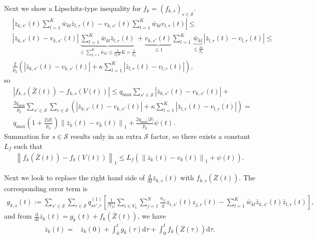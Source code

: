 \documentclass{article}
\renewcommand{\d}{\mathrm{d}}
\newcommand{\1}[1]{{\mathds{1}}_{\left\{#1\right\}}}
\begin{document}
	Next we show a Lipschitz-type inequality for $f_{k}=\left(f_{k,s} \right)_{s \in \mathcal{S}}.$ 
	\begin{align*}
		&\left|\bar{z}_{k,s'}(t)\sum_{l=1}^{K}\bar{w}_{kl}\bar{z}_{l,r}(t)	-v_{k,s'}(t)\sum_{l=1}^{K}\bar{w}_{kl}v_{l,r}(t) \right| \leq \\
		&\left|\bar{z}_{k,s'}(t)-v_{k,s'}(t) \right| \underbrace{\sum_{l=1}^{K}\bar{w}_{kl}\bar{z}_{l,r}(t)}_{\leq \sum_{k=1}^K\bar{w}_{kl} \leq \frac{2}{p_0 K}K=\frac{2}{p_0}}+\underbrace{v_{k,s'}(t)}_{\leq 1}\sum_{l=1}^{K}\underbrace{\bar{w}_{kl}}_{\leq \frac{2\kappa}{p_0} }\left|\bar{z}_{l,r}(t)-v_{l,r}(t)\right| \leq \\
		&\frac{2}{p_0}\left( \left|\bar{z}_{k,s'}(t)-v_{k,s'}(t) \right|+\kappa \sum_{l=1}^{K}\left|\bar{z}_{l,r}(t)-v_{l,r}(t) \right|\right),
	\end{align*}
	so
	\begin{align*} &\left|f_{k,s}\left(\bar{Z}(t) \right)-f_{k,s}\left(V(t) \right) \right|\leq 	
		q_{\max}\sum_{s' \in \mathcal{S}} \left|\bar{z}_{k,s'}(t)-v_{k,s'}(t) \right|+\\
		&\frac{2q_{\max}}{p_0}\sum_{s' \in \mathcal{S}}\sum_{r \in \mathcal{S}} \left( \left|\bar{z}_{k,s'}(t)-v_{k,s'}(t) \right|+\kappa \sum_{l=1}^{K}\left|\bar{z}_{l,r}(t)-v_{l,r}(t) \right|\right) = \\
		&q_{\max}\left(1+\frac{2 \left|\mathcal{S} \right|}{p_0} \right)\left \|\bar{z}_{k}(t)-v_{k}(t) \right \|_1+\frac{2q_{\max}\left|\mathcal{S} \right|}{p_0} \psi(t).
	\end{align*}
	Summation for $s\in \mathcal{S}$ results only in an extra $\mathcal{S}$ factor, so there exists a constant $L_f$ such that
	\begin{align}
		\label{eq:L_f}
		\left \|f_k \left(\overline{Z}(t) \right)-f_k \left(V(t)\right) \right \|_1 \leq L_f \left(\left \|\bar{z}_k(t)-v_k(t) \right \|_1+\psi(t) \right).
	\end{align}
	
	Next we look to replace the right hand side of $\frac{\d}{\d t} \bar{z}_{k,s}(t)$ with $f_{k,s}\left(\overline{Z}(t)\right).$ The corresponding error term is
	\begin{align}
		\label{eq:g}
		g_{k,s}(t):=\sum_{s' \in \mathcal{S}}\sum_{r \in \mathcal{S}}q_{ss',r}^{(1)} \left[\frac{1}{\left|V_k \right|}\sum_{i \in V_k}\sum_{j=1}^{N} \frac{a_{ij}}{\bar{d}}z_{i,s'}(t)z_{j,r}(t)-\sum_{l=1}^{K}{\bar{w}_{kl}}\bar{z}_{k,s'}(t)\bar{z}_{l,r}(t) \right],
	\end{align}
	and from $\frac{\d}{\d t} \bar{z}_{k}(t)=g_{k}(t)+f_k \left(\overline{Z}(t)\right)$, we have
	\begin{align*}
		\bar{z}_{k}(t)=& \bar{z}_{k}(0)+\int_{0}^{t}g_k(\tau)\d \tau+\int_{0}^{t}f_{k}\left(\overline{Z}(\tau)\right) \d \tau.
	\end{align*}
	
\end{document}
